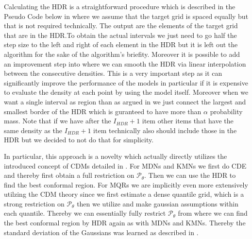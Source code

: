 Calculating the HDR is a straightforward procedure which is described in the Pseudo Code below in  where we assume that the target grid is spaced equally but that is not required technically. The output are the elements of the target grid that are in the HDR.\@ To obtain the actual intervals we just need to go half the step size to the left and right of each element in the HDR but it is left out the algorithm for the sake of the algorithm's briefity. Moreover it is possible to add an improvement step into  where we can smooth the HDR via linear interpolation between the consecutive densities. This is a very important step as it can significantly improve the performance of the models in particular if it is expensive to evaluate the density at each point by using the model itself. Moreover when we want a single interval as region than as argued in  we just connect the largest and smallest border of the HDR which is guranteed to have more than $\alpha$ probability mass. Note that if we have after the $I_{HDR} + 1$ item other items that have the same density as the $I_{HDR} + 1$ item technically also should include those in the HDR but we decided to not do that for simplicity.

In particular, this approach is a novelty which actually directly utilizes the introduced concept of CDMs detailed in . For MDNs and KMNs we first do CDE and thereby first obtain a full restriction on $\mathscr{P}_\theta$. Then we can use the HDR to find the best conformal region. For MQRs we are implicitly even more extensively utilzing the CDM theory since we first estimate a dense quantile grid, which is a strong restriction on $\mathscr{P}_\theta$ then we utilize  and make gaussian assumptions within each quantile. Thereby we can essentially fully restrict $\mathscr{P}_\theta$ from where we can find the best conformal region by HDR again as with MDNs and KMNs. Thereby the standard deviation of the Gaussians was learned as described in .

